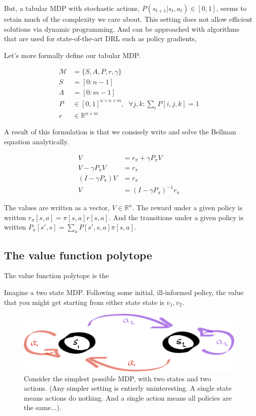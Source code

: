But, a tabular MDP with stochastic actions, $P(s_{t+1}|s_t, a_t) \in [0, 1]$,
seems to retain much of the complexity we care about. This setting does not allow
efficient solutions via dynamic programming. And can be approached with algorithms
that are used for state-of-the-art DRL such as policy gradients,

Let's more formally define our tabular MDP.

\begin{align}
\mathcal M &= \{S, A, P, r, \gamma\} \\
S &= [0:n-1] \\
A &= [0:m-1] \\
P &\in [0,1]^{n\times n \times m}, \;\;\forall j, k : \sum_i P[i, j, k] = 1 \\
r &\in \mathbb R^{n\times m}
\end{align}

A result of this formulation is that we consisely write and solve the Bellman equation analytically.

\begin{align}
V &= r_{\pi} + \gamma P_{\pi} V \tag{the bellman eqn}\\
V - \gamma P_{\pi} V &= r_{\pi}\\
(I-\gamma P_{\pi})V &= r_{\pi}\\
V &= (I-\gamma P_{\pi})^{-1}r_{\pi}
\end{align}

The values are written as a vector, $V \in \mathbb R^n$.
The reward under a given policy is written $r_{\pi}[s, a] = \pi[s, a] r[s, a]$.
And the transitions under a given policy is written $P_{\pi}[s', s] = \sum_a P[s', s, a]\pi[s, a]$.


\subsection{The value function polytope}

The value function polytope \cite{Dadashi2018} is the


Imagine a two state MDP. Following some initial, ill-informed policy,
the value that you might get starting from either state state is $v_1, v_2$.



\begin{figure}
\centering
\includegraphics[width=1\textwidth,height=0.25\textheight]{../../pictures/drawings/2-state-automata.png}
\caption{Consider the simplest possible MDP, with two states and two actions. (Any simpler setting is entierly uninteresting. A single state means actions do nothing.
And a single action means all policies are the same...).}
\end{figure}


